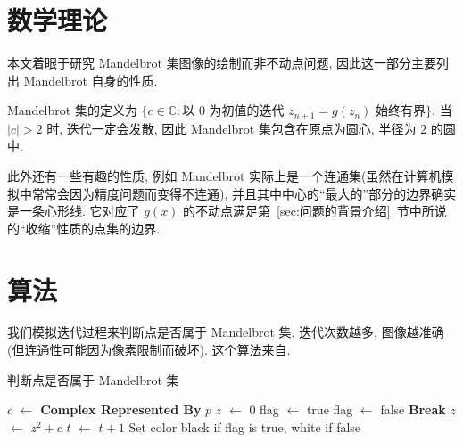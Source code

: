 \documentclass{ctexart}
\begin{document}
\section{数学理论} %
\label{sec:数学理论}
本文着眼于研究 Mandelbrot 集图像的绘制而非不动点问题, 因此这一部分主要列出 Mandelbrot 自身的性质\cite{wiki-Madelbrot_set}. \par
Mandelbrot 集的定义为 $\{c \in \mathbb{C}: \text{以 } 0 \text{ 为初值的迭代 }z_{n + 1} = g(z_n)\text{ 始终有界}\}$. 当 $\left|c\right| > 2$ 时, 迭代一定会发散, 因此 Mandelbrot 集包含在原点为圆心, 半径为 $2$ 的圆中. \par
此外还有一些有趣的性质, 例如 Mandelbrot 实际上是一个连通集(虽然在计算机模拟中常常会因为精度问题而变得不连通), 并且其中中心的``最大的''部分的边界确实是一条心形线. 它对应了 $g(x)$ 的不动点满足第~\ref{sec:问题的背景介绍}~节中所说的``收缩''性质的点集的边界\cite{tbob-Mandelbrot}.
\section{算法} %
\label{sec:算法}
我们模拟迭代过程来判断点是否属于 Mandelbrot 集. 迭代次数越多, 图像越准确(但连通性可能因为像素限制而破坏). 这个算法来自\cite{Arnaud_Cheritat-wiki-Madelbrot_set}.
\begin{algorithm}
\caption{判断点是否属于 Mandelbrot 集}
\label{algo::judge}
 {
	$c$ $\leftarrow$ \textbf{Complex Represented By} $p$\;
	$z$ $\leftarrow$ 0\;
	flag $\leftarrow$ true\;
	 {
		{
			flag $\leftarrow$ false\;
			\textbf{Break}\;
		}
		{
			$z$ $\leftarrow$ $z^2 + c$\;
			$t$ $\leftarrow$ $t + 1$\;
		}
	}
	Set color black if flag is true, white if false\;
}
\end{algorithm}
\end{document}
